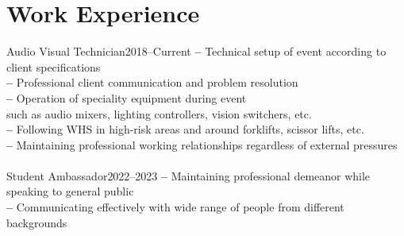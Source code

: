 \section{Work Experience}
    {Audio Visual Technician}{2018--Current}{
      \textbf{--} Technical setup of event according to client specifications \\
      \textbf{--} Professional client communication and problem resolution \\
      \textbf{--} Operation of speciality equipment during event \\
        \hspace{18pt} such as audio mixers, lighting controllers, vision switchers, etc. \\
      \textbf{--} Following WHS in high-risk areas and around forklifts, scissor lifts, etc. \\
      \textbf{--} Maintaining professional working relationships regardless of external pressures \\
    }
\\
    {Student Ambassador}{2022--2023}{
      \textbf{--} Maintaining professional demeanor while speaking to general public \\
      \textbf{--} Communicating effectively with wide range of people from different backgrounds \\
    }
